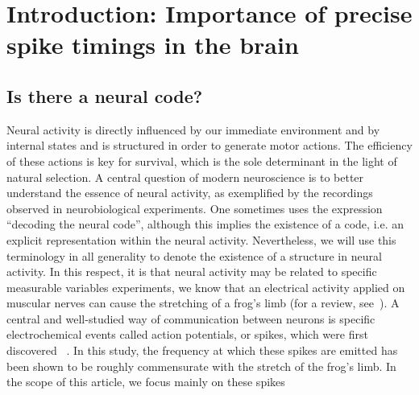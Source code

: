 \documentclass[brainsci, %
               review,submit,pdftex,moreauthors
               ]{Definitions/mdpi}
\begin{document}
%
\section{Introduction: Importance of precise spike timings in the brain}\label{sec:time}
%
\subsection{Is there a neural code?}
Neural activity is directly influenced by our immediate environment and by internal states and is structured in order to generate motor actions. The efficiency of these actions is key for survival, which is the sole determinant in the light of natural selection. A central question of modern neuroscience is to better understand the essence of neural activity, as exemplified by the recordings observed in neurobiological experiments. One sometimes uses the expression ``decoding the neural code'', although this implies the existence of a code, i.e. an explicit representation  within the neural activity. Nevertheless, we will use this terminology in all generality to denote the existence of a structure in neural activity. In this respect, it is  that neural activity may be related to specific measurable variables experiments, we know that an electrical activity applied on muscular nerves can cause the stretching of a frog's limb (for a review, see~\citep{piccolino_luigi_1997}). A central and well-studied way of communication between neurons is specific electrochemical events called action potentials, or spikes, which were first discovered ~\citep{adrian_impulses_1926}. In this study, the frequency at which these spikes are emitted has been shown to be roughly commensurate with the stretch of the frog's limb.
In the scope of this article, we focus mainly on these spikes
\end{document}
